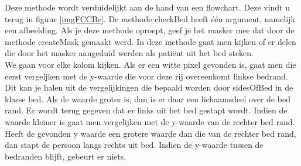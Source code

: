 Deze methode wordt verduidelijkt aan de hand van een flowchart. Deze vindt u terug in figuur \ref{imgFCCBe}. De methode checkBed heeft \'e\'en argument, namelijk een afbeelding. Als je deze methode oproept, geef je het masker mee dat door de methode createMask gemaakt werd. In deze methode gaat men kijken of er delen die door het masker aangeduid werden als pati\"ent uit het bed steken. \\
We gaan voor elke kolom kijken. Als er een witte pixel gevonden is, gaat men die eerst vergeljken met de y-waarde die voor deze rij overeenkomt linkse bedrand. Dit kan je halen uit de vergelijkingen die bepaald worden door sidesOfBed in de klasse bed. Als de waarde groter is, dan is er daar een lichaamsdeel over de bed rand. Er wordt terug gegeven dat er links uit het bed gestapt wordt. Indien de waarde kleiner is gaat men vergelijken met de y-waarde van de rechter bed rand. Heeft de gevonden y waarde een grotere waarde dan die van de rechter bed rand, dan stapt de persoon langs rechts uit bed. Indien de y-waarde tussen de bedranden blijft, gebeurt er niets.

